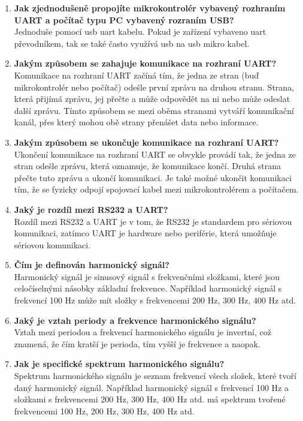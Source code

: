 \documentclass{article}
\begin{document}
\begin{enumerate}
        \item \textbf{Jak zjednodušeně propojíte mikrokontrolér vybavený rozhraním UART a počítač typu PC vybavený rozraním USB?} \\[0.6em] { Jednoduše pomocí usb uart kabelu. Pokud je zařízení vybaveno uart převodníkem, tak se také často využívá usb na usb mikro kabel.}
        \item \textbf{Jakým způsobem se zahajuje komunikace na rozhraní UART?} \\[0.6em] { Komunikace na rozhraní UART začíná tím, že jedna ze stran (buď mikrokontrolér nebo počítač) odešle první zprávu na druhou stranu. Strana, která přijímá zprávu, jej přečte a může odpovědět na ni nebo může odeslat další zprávu. Tímto způsobem se mezi oběma stranami vytváří komunikační kanál, přes který mohou obě strany přenášet data nebo informace.}
        \item \textbf{Jakým způsobem se ukončuje komunikace na rozhraní UART?} \\[0.6em] { Ukončení komunikace na rozhraní UART se obvykle provádí tak, že jedna ze stran odešle zprávu, která oznamuje, že komunikace končí. Druhá strana přečte tuto zprávu a ukončí komunikaci. Je také možné ukončit komunikaci tím, že se fyzicky odpojí spojovací kabel mezi mikrokontrolérem a počítačem.}
        \item \textbf{Jaký je rozdíl mezi RS232 a UART?} \\[0.6em] { Rozdíl mezi RS232 a UART je v tom, že RS232 je standardem pro sériovou komunikaci, zatímco UART je hardware nebo periférie, která umožňuje sériovou komunikaci.}
        \item \textbf{Čím je definován harmonický signál?} \\[0.6em] { Harmonický signál je sinusový signál s frekvenčními složkami, které jsou celočíselnými násobky základní frekvence. Například harmonický signál s frekvencí 100 Hz může mít složky s frekvencemi 200 Hz, 300 Hz, 400 Hz atd.}
        \item \textbf{Jaký je vztah periody a frekvence harmonického signálu?} \\[0.6em] { Vztah mezi periodou a frekvencí harmonického signálu je invertní, což znamená, že čím kratší je perioda, tím vyšší je frekvence a naopak.}
        \item \textbf{Jak je specifické spektrum harmonického signálu?} \\[0.6em] {Spektrum harmonického signálu je seznam frekvencí všech složek, které tvoří daný harmonický signál. Například harmonický signál s frekvencí 100 Hz a složkami s frekvencemi 200 Hz, 300 Hz, 400 Hz atd. má spektrum tvořené frekvencemi 100 Hz, 200 Hz, 300 Hz, 400 Hz atd.}

\end{enumerate}
\end{document}
